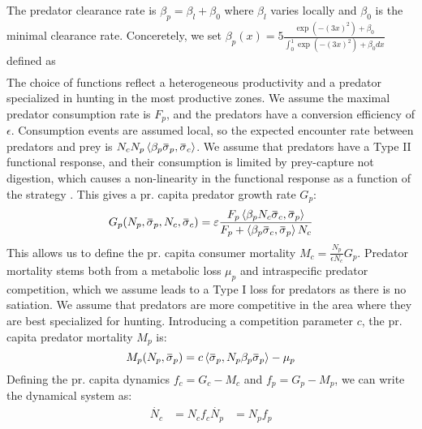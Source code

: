 The predator clearance rate is $\beta_p = \beta_{l} + \beta_0$ where $\beta_l$ varies locally and $\beta_0$ is the minimal clearance rate. Conceretely, we set $\beta_p(x) = 5 \frac{\exp(-(3 x)^2) + \beta_0}{\int_0^1 \exp(-(3 x)^2) + \beta_0 dx}$
 defined as
\begin{align}
\end{align}
The choice of functions reflect a heterogeneous productivity and a predator specialized in hunting in the most productive zones. We assume the maximal predator consumption rate is $F_p$, and the predators have a conversion efficiency of $\epsilon$. Consumption events are assumed local, so the expected encounter rate between predators and prey is $N_c N_p \ip{\beta_p \overbar{\sigma}_p}{\overbar{\sigma}_c}$. We assume that predators have a Type II functional response, and their consumption is limited by prey-capture not digestion, which causes a non-linearity in the functional response as a function of the strategy \citep{Kioerboe2018}. This gives a pr. capita predator growth rate $G_p$:
\begin{equation}
  G_p(N_p, \overbar{\sigma}_p, N_c, \overbar{\sigma}_c )= \epsilon\frac{F_p \ip{\beta_p N_c\overbar{\sigma}_c}{\overbar{\sigma}_p} }{F_p + \ip{\beta_p \overbar{\sigma}_c}{\overbar{\sigma}_p} N_c}
\end{equation}
This allows us to define the pr. capita consumer mortality $M_c = \frac{N_p}{\epsilon N_c}G_p$. Predator mortality stems both from a metabolic loss $\mu_p$ and intraspecific predator competition, which we assume leads to a Type I loss for predators as there is no satiation. We assume that predators are more competitive in the area where they are best specialized for hunting. Introducing a competition parameter $c$, the pr. capita predator mortality $M_p$ is:
\begin{equation}
  M_p(N_p, \overbar{\sigma}_p) =  c \ip{\overbar{\sigma}_p}{N_p\beta_p \overbar{\sigma}_p}  - \mu_p
\end{equation}
Defining the pr. capita dynamics $f_c = G_c - M_c$ and $f_p = G_p - M_p$, we can write the dynamical system as:
\begin{align}
  \dot{N_c} &= N_c f_c
  \dot{N_p} &= N_p f_p
  \label{eq:dynamics}
\end{align}

